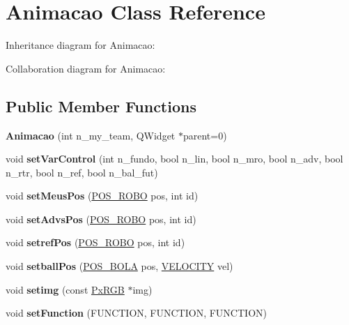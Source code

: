 \hypertarget{classAnimacao}{}\section{Animacao Class Reference}
\label{classAnimacao}


Inheritance diagram for Animacao\+:


Collaboration diagram for Animacao\+:
\subsection*{Public Member Functions}
\begin{DoxyCompactItemize}
\item 
{\bfseries Animacao} (int n\+\_\+my\+\_\+team, Q\+Widget $\ast$parent=0)\hypertarget{classAnimacao_a2cdb82bd3372defea1b96bdac22c873f}{}\label{classAnimacao_a2cdb82bd3372defea1b96bdac22c873f}

\item 
void {\bfseries set\+Var\+Control} (int n\+\_\+fundo, bool n\+\_\+lin, bool n\+\_\+mro, bool n\+\_\+adv, bool n\+\_\+rtr, bool n\+\_\+ref, bool n\+\_\+bal\+\_\+fut)\hypertarget{classAnimacao_a2701125bce4a7e46b084a0725c37f90b}{}\label{classAnimacao_a2701125bce4a7e46b084a0725c37f90b}

\item 
void {\bfseries set\+Meus\+Pos} (\hyperlink{structPOS__ROBO}{P\+O\+S\+\_\+\+R\+O\+BO} pos, int id)\hypertarget{classAnimacao_ae41b6d94074ceddbf900a2c162c9b72e}{}\label{classAnimacao_ae41b6d94074ceddbf900a2c162c9b72e}

\item 
void {\bfseries set\+Advs\+Pos} (\hyperlink{structPOS__ROBO}{P\+O\+S\+\_\+\+R\+O\+BO} pos, int id)\hypertarget{classAnimacao_a0a764c972d3ae05afa8f6ad9854d0688}{}\label{classAnimacao_a0a764c972d3ae05afa8f6ad9854d0688}

\item 
void {\bfseries setref\+Pos} (\hyperlink{structPOS__ROBO}{P\+O\+S\+\_\+\+R\+O\+BO} pos, int id)\hypertarget{classAnimacao_aaf3a3f435171f0039ef9ca6c5b9165fc}{}\label{classAnimacao_aaf3a3f435171f0039ef9ca6c5b9165fc}

\item 
void {\bfseries setball\+Pos} (\hyperlink{structPOS__BOLA}{P\+O\+S\+\_\+\+B\+O\+LA} pos, \hyperlink{structVELOCITY}{V\+E\+L\+O\+C\+I\+TY} vel)\hypertarget{classAnimacao_ae4f9aa49526d8feb97a9071c50fd8e87}{}\label{classAnimacao_ae4f9aa49526d8feb97a9071c50fd8e87}

\item 
void {\bfseries setimg} (const \hyperlink{classPxRGB}{Px\+R\+GB} $\ast$img)\hypertarget{classAnimacao_ac2227f24fee38caf698198761a46c282}{}\label{classAnimacao_ac2227f24fee38caf698198761a46c282}

\item 
void {\bfseries set\+Function} (F\+U\+N\+C\+T\+I\+ON, F\+U\+N\+C\+T\+I\+ON, F\+U\+N\+C\+T\+I\+ON)\hypertarget{classAnimacao_ac00cd47f5957427ac385aee1cdd1c16b}{}\label{classAnimacao_ac00cd47f5957427ac385aee1cdd1c16b}

\end{DoxyCompactItemize}

